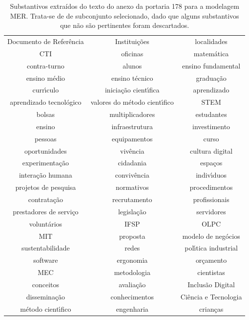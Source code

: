 \documentclass[
12pt,		%
openright,	%
twoside,  %
a4paper,			%
chapter=TITLE,		%
english,			%
french,				%
spanish,			%
brazil				%
]{USPSC-classe/USPSC}
\begin{document}
\begin{table}[htb]
\tiny
\caption{\label{4323829d8b7f5162f6cfb58db4d222366e959840}Substantivos extra\'{i}dos do texto do anexo da portaria 178 para a modelagem MER. Trata-se de de subconjunto selecionado, dado que alguns substantivos que n\~ao s\~ao pertinentes foram descartados.}

\centering
\begin{tabular}{|c|c|c|}
\hline
Documento de Refer\^encia  &  Institui\c{c}\~oes  &  localidades \\
CTI  &  oficinas  &  matem\'atica  \\
contra-turno  &  alunos  &  ensino fundamental \\
ensino m\'edio  &  ensino t\'ecnico  &  gradua\c{c}\~ao \\
curr\'{\i}culo  &  inicia\c{c}\~ao cient\'{\i}fica  &  aprendizado \\
aprendizado tecnol\'ogico  &  valores do m\'etodo cient\'{\i}fico  &  STEM \\
bolsas  &  multiplicadores  &  estudantes \\
ensino  &  infraestrutura  &  investimento \\
pessoas  &  equipamentos  &  curso \\
oportunidades  &  viv\^encia  &  cultura digital \\
experimenta\c{c}\~ao  &  cidadania  &  espa\c{c}os \\
intera\c{c}\~ao humana  &  conviv\^encia  &  indiv\'{\i}duos  \\
projetos de pesquisa  &  normativos  &  procedimentos \\
contrata\c{c}\~ao  &  recrutamento  &  profissionais \\
prestadores de servi\c{c}o  &  legisla\c{c}\~ao  &  servidores \\
volunt\'arios  &  IFSP  &  OLPC \\
MIT  &  proposta  &  modelo de neg\'ocios \\
sustentabilidade  &  redes  &  pol\'{\i}tica industrial \\
software  &  ergonomia  &  or\c{c}amento \\
MEC  &  metodologia  &  cientistas  \\
conceitos  &  avalia\c{c}\~ao  &  Inclus\~ao Digital \\
dissemina\c{c}\~ao  &  conhecimentos  &  Ci\^encia e Tecnologia \\
m\'etodo cient\'{\i}fico  &  engenharia  &  crian\c{c}as \\

\end{tabular}
\end{table}
\end{document}
